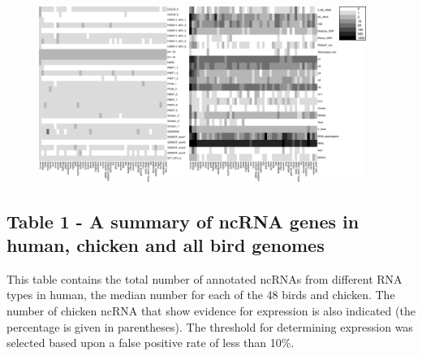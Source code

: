 \documentclass[10pt]{bmc_article}
\newenvironment{bmcformat}{\begin{raggedright}\baselineskip20pt\sloppy\setboolean{publ}{false}}{\end{raggedright}\baselineskip20pt\sloppy}
\begin{document}
\begin{bmcformat}
 \begin{figure}[ht]
   \centering
   \includegraphics[width=0.95\textwidth]{figures/figure1.pdf}
 \end{figure}


\clearpage
\newpage

\subsection*{Table 1 - A summary of ncRNA genes in human, chicken and all bird genomes}

This table contains the total number of annotated ncRNAs from
different RNA types in human, the median number for each of the 48
birds and chicken. The number of chicken ncRNA that show evidence for
expression is also indicated (the percentage is given in parentheses).
The threshold for determining expression was selected based upon a
false positive rate of less than 10\%.\label{table:1}


\end{bmcformat}
\end{document}
